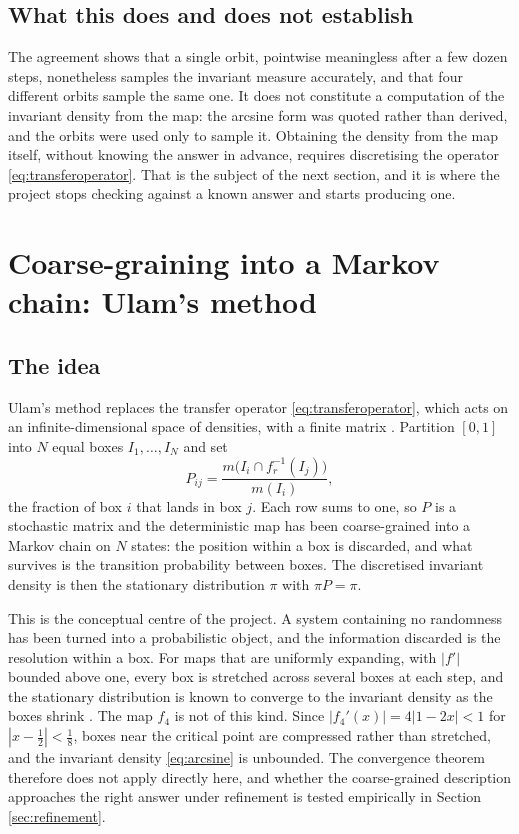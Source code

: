 \documentclass[11pt,a4paper]{article}
\theoremstyle{definition}
\theoremstyle{remark}
\newcommand{\logmap}{f_r}
\begin{document}
\subsection{What this does and does not establish}

The agreement shows that a single orbit, pointwise meaningless after a few
dozen steps, nonetheless samples the invariant measure accurately, and that
four different orbits sample the same one. It does not constitute a
computation of the invariant density from the map: the arcsine form was quoted
rather than derived, and the orbits were used only to sample it. Obtaining the
density from the map itself, without knowing the answer in advance, requires
discretising the operator \eqref{eq:transferoperator}. That is the subject of
the next section, and it is where the project stops checking against a known
answer and starts producing one.

\section{Coarse-graining into a Markov chain: Ulam's method}
\label{sec:ulam}

\subsection{The idea}

Ulam's method replaces the transfer operator \eqref{eq:transferoperator},
which acts on an infinite-dimensional space of densities, with a finite matrix
\cite{Ulam1960,Li1976,BoyarskyGora1997}. Partition $[0,1]$ into $N$ equal boxes
$I_1,\ldots,I_N$ and set
\begin{equation}
  P_{ij} = \frac{m\bigl(I_i\cap\logmap^{-1}(I_j)\bigr)}{m(I_i)} ,
  \label{eq:ulam}
\end{equation}
the fraction of box $i$ that lands in box $j$. Each row sums to one, so $P$ is
a stochastic matrix and the deterministic map has been coarse-grained into a
Markov chain on $N$ states: the position within a box is discarded, and what
survives is the transition probability between boxes. The discretised
invariant density is then the stationary distribution $\pi$ with $\pi P=\pi$.

This is the conceptual centre of the project. A system containing no
randomness has been turned into a probabilistic object, and the
information discarded is the resolution within a box. For maps that are
uniformly expanding, with $|f'|$ bounded above one, every box is stretched
across several boxes at each step, and the stationary distribution is known to
converge to the invariant density as the boxes shrink
\cite{Li1976,BoyarskyGora1997}. The map $f_4$ is not of this kind. Since
$|f_4'(x)|=4|1-2x|<1$ for $|x-\tfrac12|<\tfrac18$, boxes near the critical
point are compressed rather than stretched, and the invariant density
\eqref{eq:arcsine} is unbounded. The convergence theorem therefore does not
apply directly here, and whether the coarse-grained description approaches the
right answer under refinement is tested empirically in Section
\ref{sec:refinement}.
\end{document}
